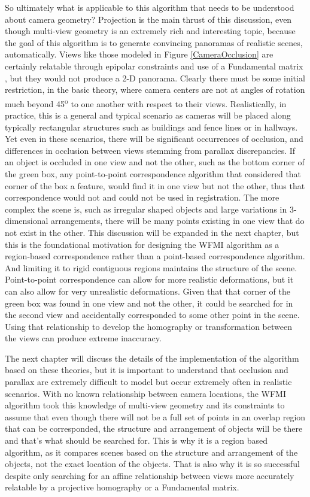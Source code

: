 So ultimately what is applicable to this algorithm that needs to be understood about camera geometry? Projection is the main thrust of this discussion, even though multi-view geometry is an extremely rich and interesting topic, because the goal of this algorithm is to generate convincing panoramas of realistic scenes, automatically. Views like those modeled in Figure \ref{CameraOcclusion} are certainly relatable through epipolar constraints and use of a Fundamental matrix \cite{Hartley2003}, but they would not produce a 2-D panorama. Clearly there must be some initial restriction, in the basic theory, where camera centers are not at angles of rotation much beyond 45\textsuperscript{o} to one another with respect to their views. Realistically, \ie{ }in practice, this is a general and typical scenario as cameras will be placed along typically rectangular structures such as buildings and fence lines or in hallways. Yet even in these scenarios, there will be significant occurrences of occlusion, and differences in occlusion between views stemming from parallax discrepancies. If an object is occluded in one view and not the other, such as the bottom corner of the green box, any point-to-point correspondence algorithm that considered that corner of the box a feature, would find it in one view but not the other, thus that correspondence would not and could not be used in registration. The more complex the scene is, such as irregular shaped objects and large variations in 3-dimensional arrangements, there will be many points existing in one view that do not exist in the other. This discussion will be expanded in the next chapter, but this is the foundational motivation for designing the WFMI algorithm as a region-based correspondence rather than a point-based correspondence algorithm. And limiting it to rigid contiguous regions maintains the structure of the scene. Point-to-point correspondence can allow for more realistic deformations, but it can also allow for very unrealistic deformations. Given that that corner of the green box was found in one view and not the other, it could be searched for in the second view and accidentally corresponded to some other point in the scene. Using that relationship to develop the homography or transformation between the views \cite{Hartley2003} can produce extreme inaccuracy.

The next chapter will discuss the details of the implementation of the algorithm based on these theories, but it is important to understand that occlusion and parallax are extremely difficult to model but occur extremely often in realistic scenarios. With no known relationship between camera locations, the WFMI algorithm took this knowledge of multi-view geometry and its constraints to assume that even though there will not be a full set of points in an overlap region that can be corresponded, the structure and arrangement of objects will be there and that's what should be searched for. This is why it is a region based algorithm, as it compares scenes based on the structure and arrangement of the objects, not the exact location of the objects. That is also why it is so successful despite only searching for an affine relationship between views more accurately relatable by a projective homography or a Fundamental matrix.


